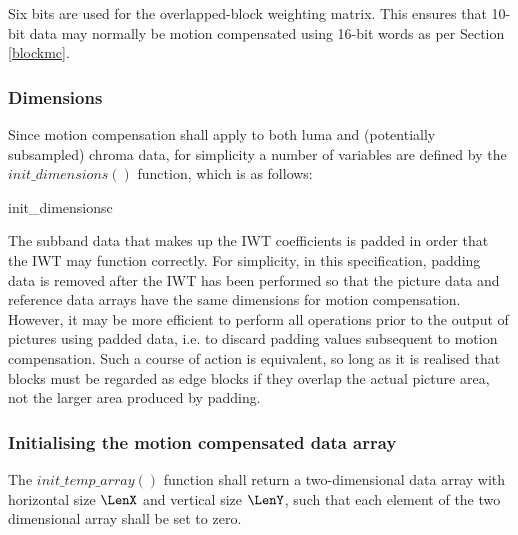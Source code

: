 \begin{informative}
Six bits are used for the overlapped-block weighting matrix. This ensures that 10-bit
data may normally be motion compensated using 16-bit words as per Section \ref{blockmc}.
\end{informative}

\subsubsection{Dimensions}
\label{mcdimensions}
Since motion compensation shall apply to both luma and (potentially subsampled)
chroma data, for simplicity a number of variables are defined by the 
$init\_dimensions()$ function, which is as follows:

\begin{pseudo}{init\_dimensions}{c}
   \bsCODE{\LenX=\LumaWidth}
   \bsCODE{\LenY=\LumaHeight}
   \bsCODE{\XBlen=\LumaXBlen}
   \bsCODE{\YBlen=\LumaYBlen}
   \bsCODE{\XBsep=\LumaXBsep}
   \bsCODE{\YBsep=\LumaYBsep}
\bsELSE
   \bsCODE{\LenX=\ChromaWidth}
   \bsCODE{\LenY=\ChromaHeight}
   \bsCODE{\XBlen=\ChromaXBlen}
   \bsCODE{\YBlen=\ChromaYBlen}
   \bsCODE{\XBsep=\ChromaXBsep}
   \bsCODE{\YBsep=\ChromaYBsep}
\bsEND
{}
\end{pseudo}

\begin{informative}
The subband data that makes up the IWT coefficients is padded in order that the IWT
may function correctly. For simplicity, in this specification, padding data is removed
after the IWT has been performed so that the picture data and reference data arrays have
the same dimensions for motion compensation. However, it may be more efficient to 
perform all operations prior to the output of pictures using padded data, i.e. to discard
 padding values subsequent to motion compensation. Such a course of action is equivalent,
 so long as it is realised that blocks must be regarded as edge blocks if they overlap the
 actual picture area, not the larger area produced by padding.
\end{informative}

\subsubsection{Initialising the motion compensated data array}
\label{mctemparray}

The $init\_temp\_array()$ function shall return a two-dimensional data array with
horizontal size $\LenX$ and vertical size $\LenY$, such that each element of the two dimensional array shall be set to zero.


